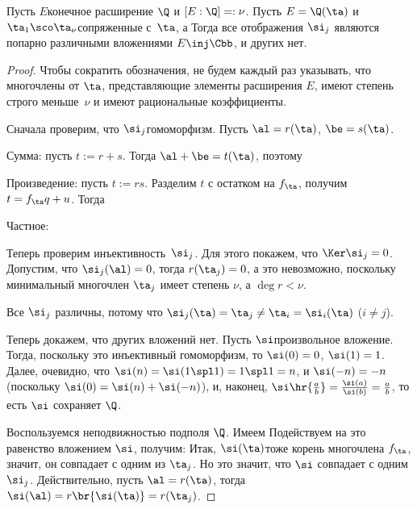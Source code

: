 \documentclass[a4paper]{article}
\begin{document}
\begin{theorem}
Пусть $E$\т конечное расширение $\Q$ и $[E:\Q] =:\nu$. Пусть $E=\Q(\ta)$
и $\ta_1\sco \ta_\nu$\т сопряженные с~$\ta$, а
Тогда все отображения $\si_j$ являются попарно различными вложениями $E \inj \Cbb$,
и других нет.
\end{theorem}
\begin{proof}
Чтобы сократить обозначения, не будем каждый раз указывать, что многочлены от $\ta$,
представляющие элементы расширения $E$, имеют степень строго меньше~$\nu$ и имеют рациональные
коэффициенты.

 Сначала проверим, что $\si_j$\т гомоморфизм. Пусть $\al=r(\ta)$, $\be=s(\ta)$.

Сумма: пусть $t:=r+s$. Тогда $\al+\be=t(\ta)$, поэтому

Произведение: пусть $t := rs$. Разделим $t$ с остатком на $f_\ta$,
получим $t=f_\ta q+u$. Тогда

Частное:

 Теперь проверим инъективность~$\si_j$. Для этого покажем, что $\Ker \si_j = 0$.
Допустим, что $\si_j(\al) = 0$, тогда $r(\ta_j) = 0$, а это невозможно, поскольку минимальный многочлен $\ta_j$
имеет степень $\nu$, а $\deg r < \nu$.

Все $\si_j$ различны, потому что $\si_j(\ta)=\ta_j\neq\ta_i=\si_i(\ta)$ ($i\neq j$).

 Теперь докажем, что других вложений нет. Пусть $\si$\т произвольное вложение. Тогда,
поскольку это инъективный гомоморфизм, то $\si(0)=0$, $\si(1)=1$.
Далее, очевидно, что $\si(n)= \si(1\spl 1) = 1\spl 1 = n$, и $\si(-n)=-n$ (поскольку $\si(0)=\si(n)+\si(-n)$),
и, наконец, $\si\hr{\frac ab}=\frac{\si(a)}{\si(b)}=\frac ab$,
то есть $\si$ сохраняет $\Q$.

Воспользуемся неподвижностью подполя $\Q$. Имеем
Подействуем на это равенство вложением $\si$, получим:
Итак, $\si(\ta)$\т тоже корень многочлена $f_{\ta}$, значит, он совпадает с одним из $\ta_j$.
Но это значит, что $\si$ совпадает с одним $\si_j$. Действительно,
пусть $\al=r(\ta)$, тогда $\si(\al)=r\br{\si(\ta)}=r(\ta_j)$.
\end{proof}
\end{document}
